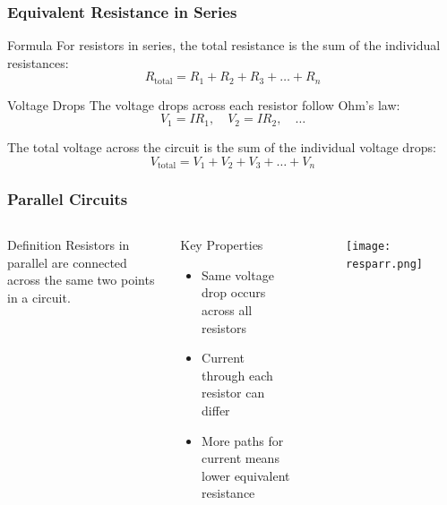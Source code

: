 \documentclass{beamer}
\begin{document}
\begin{frame}
    \frametitle{Equivalent Resistance in Series}
    \begin{block}{Formula}
        For resistors in series, the total resistance is the sum of the individual resistances:
        \begin{equation}
            R_{\text{total}} = R_1 + R_2 + R_3 + \ldots + R_n
        \end{equation}
    \end{block}
    
    \begin{block}{Voltage Drops}
        The voltage drops across each resistor follow Ohm's law:
        \begin{equation}
            V_1 = IR_1, \quad V_2 = IR_2, \quad \ldots
        \end{equation}
        
        The total voltage across the circuit is the sum of the individual voltage drops:
        \begin{equation}
            V_{\text{total}} = V_1 + V_2 + V_3 + \ldots + V_n
        \end{equation}
    \end{block}
\end{frame}

\begin{frame}
    \frametitle{Parallel Circuits}
    \begin{columns}
        \begin{block}{Definition}
            Resistors in parallel are connected across the same two points in a circuit.
        \end{block}
        
        \begin{block}{Key Properties}
            \begin{itemize}
                \item Same voltage drop occurs across all resistors
                \item Current through each resistor can differ
                \item More paths for current means lower equivalent resistance
            \end{itemize}
        \end{block}
        
        \begin{alertblock}{ }
           \begin{figure}
               \centering
               \texttt{[image: resparr.png]}
           \end{figure}
        \end{alertblock}
    \end{columns}
\end{frame}
\end{document}
